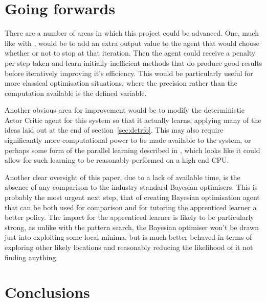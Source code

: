 \section{Going forwards}
There are a number of areas in which this project could be advanced. One, much like with \cite{RVA}, would be to add an extra output value to the agent that would choose whether or not to stop at that iteration. Then the agent could receive a penalty per step taken and learn initially inefficient methods that do produce good results before iteratively improving it's efficiency. This would be particularly useful for more classical optimisation situations, where the precision rather than the computation available is the defined variable.

Another obvious area for improvement would be to modify the deterministic Actor Critic agent for this system so that it actually learns, applying many of the ideas laid out at the end of section~\ref{sec:detrfo}. This may also require significantly more computational power to be made available to the system, or perhaps some form of the parallel learning described in \cite{deepmindparallel}, which looks like it could allow for such learning to be reasonably performed on a high end CPU.

Another clear oversight of this paper, due to a lack of available time, is the absence of any comparison to the industry standard Bayesian optimisers. This is probably the most urgent next step, that of creating Bayesian optimisation agent that can be both used for comparison and for tutoring the apprenticed learner a better policy. The impact for the apprenticed learner is likely to be particularly strong, as unlike with the pattern search, the Bayesian optimiser won't be drawn just into exploiting some local minima, but is much better behaved in terms of exploring other likely locations and reasonably reducing the likelihood of it not finding anything.


\section{Conclusions}